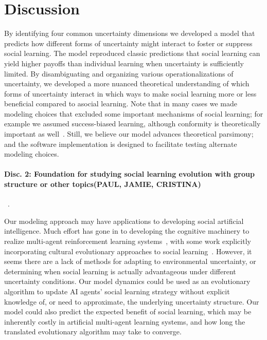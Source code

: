 \documentclass[letterpaper,11.5pt]{scrartcl}
\begin{document}
\section{Discussion}

By identifying four common uncertainty dimensions we developed a model that predicts
how different forms of uncertainty might interact to foster or suppress social
learning.  The model reproduced classic predictions that social learning can yield
higher payoffs than individual learning when uncertainty is sufficiently limited.
By disambiguating and organizing various operationalizations of uncertainty, 
we developed a more nuanced theoretical understanding of which forms of
uncertainty interact in which ways to make social learning more or less beneficial
compared to asocial learning.  Note that in many cases we made modeling choices that
excluded some important mechanisms of social learning; for example we assumed
success-biased learning, although conformity is theoretically important as
well~\cite{Muthukrishna2016a,Smaldino2018b}. Still, we believe our model
advances theoretical parsimony; and the software implementation is designed to
facilitate testing alternate modeling choices. 

\paragraph{Disc. 2: Foundation for studying social learning evolution with group
structure or other topics(PAUL, JAMIE, CRISTINA)}~\cite{Katsnelson2014}.

Our modeling approach may have applications to developing social artificial
intelligence. Much effort has gone in to developing the cognitive machinery to
realize multi-agent reinforcement learning
systems~\cite{Sandholm1996,Ndousse2021,Gronauer2022}, with some work explicitly
incorporating cultural evolutionary approaches to social learning~\cite{Jaques2019}.
However, it seems there are a lack of methods for adapting to environmental
uncertainty, or determining when social learning is actually advantageous under
different uncertainty conditions. Our model dynamics could be used as an
evolutionary algorithm to update AI agents' social learning strategy without
explicit knowledge of, or need to approximate, the underlying uncertainty structure.
Our model could also predict the expected benefit of social learning, which may be
inherently costly in artificial multi-agent learning systems, and how long the
translated evolutionary algorithm may take to converge.
\end{document}
